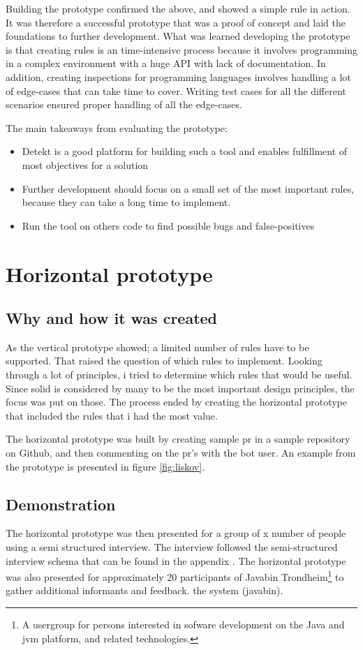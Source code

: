 \documentclass{report}
\begin{document}
Building the prototype confirmed the above, and showed a simple rule in action. It was therefore a successful prototype that was a proof of concept and laid the foundations to further development. What was learned developing the prototype is that creating rules is an time-intensive process because it involves programming in a complex environment with a huge API with lack of documentation. In addition, creating inspections for programming languages involves handling a lot of edge-cases that can take time to cover. Writing test cases for all the different scenarios ensured proper handling of all the edge-cases.


The main takeaways from evaluating the prototype:
\begin{itemize}
    \item Detekt is a good platform for building such a tool and enables fulfillment of most objectives for a solution
    \item Further development should focus on a small set of the most important rules, because they can take a long time to implement.
    \item Run the tool on others code to find possible bugs and false-positives
\end{itemize}

\section{Horizontal prototype}
\subsection*{Why and how it was created}
As the vertical prototype showed; a limited number of rules have to be supported. That raised the question of which rules to implement. Looking through a lot of principles, i tried to determine which rules that would be useful. Since \gls{solid} is considered by many to be the most important design principles, the focus was put on those. The process ended by creating the horizontal prototype that included the rules that i had the most value. 


The horizontal prototype was built by creating sample \gls{pr} in a sample repository on Github\cite{sample-repository}, and then commenting on the \gls{pr}'s with the bot user. An example from the prototype is presented in figure \ref{fig:liskov}.

\subsection*{Demonstration}
The horizontal prototype was then presented for a group of x number of people using a semi structured interview. The interview followed the semi-structured interview schema that can be found in the appendix \cite{}. The horizontal prototype was also presented for approximately 20 participants of Javabin Trondheim\footnote{A usergroup for persons interested in sofware development on the Java and \gls{jvm} platform, and related technologies.} to gather additional informants and feedback. the system (javabin). 
\end{document}
